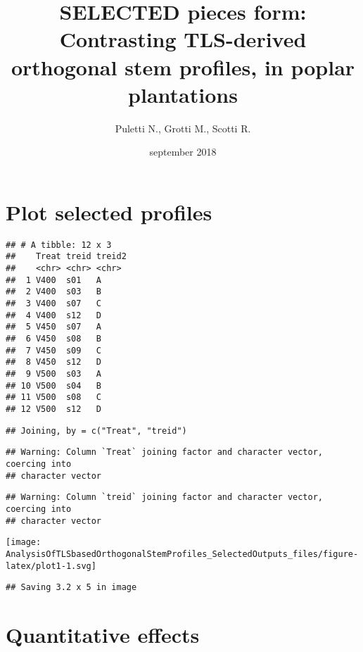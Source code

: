 \documentclass[]{article}
\title{SELECTED pieces form: Contrasting TLS-derived orthogonal stem profiles,
in poplar plantations}
\author{Puletti N., Grotti M., Scotti R.}
\date{september 2018}
\begin{document}
\maketitle

{
\setcounter{tocdepth}{2}
\tableofcontents
}
\hypertarget{plot-selected-profiles}{%
\section{Plot selected profiles}\label{plot-selected-profiles}}

\begin{verbatim}
## # A tibble: 12 x 3
##    Treat treid treid2
##    <chr> <chr> <chr> 
##  1 V400  s01   A     
##  2 V400  s03   B     
##  3 V400  s07   C     
##  4 V400  s12   D     
##  5 V450  s07   A     
##  6 V450  s08   B     
##  7 V450  s09   C     
##  8 V450  s12   D     
##  9 V500  s03   A     
## 10 V500  s04   B     
## 11 V500  s08   C     
## 12 V500  s12   D
\end{verbatim}

\begin{verbatim}
## Joining, by = c("Treat", "treid")
\end{verbatim}

\begin{verbatim}
## Warning: Column `Treat` joining factor and character vector, coercing into
## character vector
\end{verbatim}

\begin{verbatim}
## Warning: Column `treid` joining factor and character vector, coercing into
## character vector
\end{verbatim}

\texttt{[image: AnalysisOfTLSbasedOrthogonalStemProfiles\_SelectedOutputs\_files/figure-latex/plot1-1.svg]}

\begin{verbatim}
## Saving 3.2 x 5 in image
\end{verbatim}

\hypertarget{quantitative-effects}{%
\section{Quantitative effects}\label{quantitative-effects}}
\end{document}
